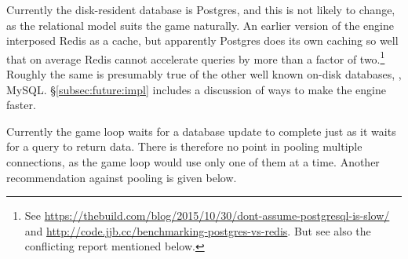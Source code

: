 
Currently the disk-resident database is Postgres, and this is not likely to
change, as the relational model suits the game naturally.
An earlier version of the engine interposed
Redis as a cache, but apparently Postgres does its own caching so well that on
average Redis cannot accelerate queries by more than a factor of two.\footnote{
See \url{https://thebuild.com/blog/2015/10/30/dont-assume-postgresql-is-slow/}
and \url{http://code.jjb.cc/benchmarking-postgres-vs-redis}.
But see
also the conflicting report mentioned below.} Roughly the same is presumably
true of the other well known on-disk databases, \eg, MySQL\@.
\S\ref{subsec:future:impl} includes a discussion of ways to make
the engine faster.

Currently the game loop waits for a database update to complete just as it
waits for a query to return data.
There is therefore no point in pooling multiple connections, as the game loop
would use only one of them at a time.
Another recommendation against pooling
is given below.
